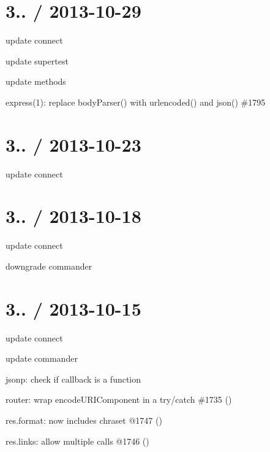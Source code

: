 \section*{3.. / 2013-\/10-\/29 }


\begin{DoxyItemize}
\item update connect
\item update supertest
\item update methods
\item express(1)\+: replace body\+Parser() with urlencoded() and json() \#1795 
\end{DoxyItemize}

\section*{3.. / 2013-\/10-\/23 }


\begin{DoxyItemize}
\item update connect
\end{DoxyItemize}

\section*{3.. / 2013-\/10-\/18 }


\begin{DoxyItemize}
\item update connect
\item downgrade commander
\end{DoxyItemize}

\section*{3.. / 2013-\/10-\/15 }


\begin{DoxyItemize}
\item update connect
\item update commander
\item jsonp\+: check if callback is a function
\item router\+: wrap encode\+U\+R\+I\+Component in a try/catch \#1735 ()
\item res.\+format\+: now includes chraset @1747 ()
\item res.\+links\+: allow multiple calls @1746 ()
\end{DoxyItemize}

